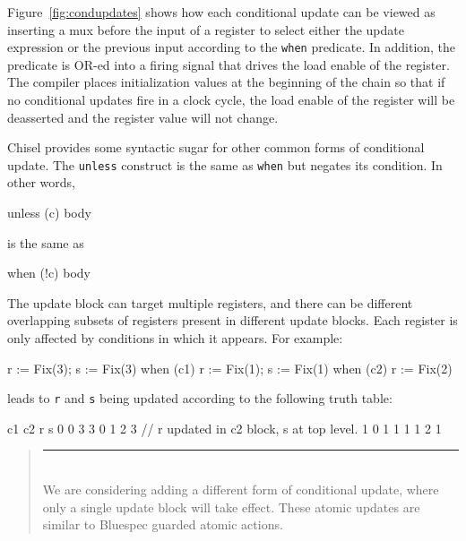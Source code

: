 \documentclass[twocolumn,10pt]{article}
\newenvironment{commentary}
{ \vspace{-0.1in}
  \begin{quotation}
  \noindent
  \small \em
  \rule{\linewidth}{1pt}\\
}
{
  \end{quotation}
}
\def\code#1{{\tt #1}}
\begin{document}
Figure~\ref{fig:condupdates} shows how each conditional update can be
viewed as inserting a mux before the input of a register to select
either the update expression or the previous input according to the
\code{when} predicate.  In addition, the predicate is OR-ed into a
firing signal that drives the load enable of the register.  The
compiler places initialization values at the beginning of the chain so
that if no conditional updates fire in a clock cycle, the load enable
of the register will be deasserted and the register value will not
change.
 
Chisel provides some syntactic sugar for other common forms of
conditional update.  The \verb+unless+ construct is the same as
\verb+when+ but negates its condition.  In other words,
\begin{scala}
unless (c) { body }
\end{scala}
is the same as
\begin{scala}
when (!c) { body }
\end{scala}

% 

The update block can target multiple registers, and there can be
different overlapping subsets of registers present in different update
blocks.  Each register is only affected by conditions in which it
appears.  For example:
\begin{scala}
r := Fix(3); s := Fix(3)
when (c1)   { r := Fix(1); s := Fix(1) }
when (c2)   { r := Fix(2) }
\end{scala}

\noindent
leads to \code{r} and \code{s} being updated according to the
following truth table:
\begin{scala}
c1 c2  r  s
0   0  3  3
0   1  2  3 // r updated in c2 block, s at top level.
1   0  1  1
1   1  2  1
\end{scala}

\begin{commentary}
We are considering adding a different form of conditional update,
where only a single update block will take effect.  These atomic
updates are similar to Bluespec guarded atomic actions.
\end{commentary}
\end{document}
